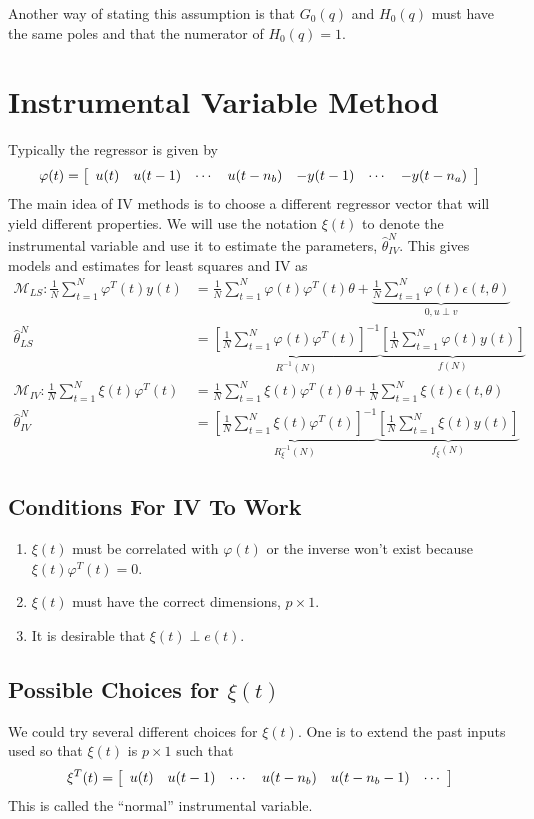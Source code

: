 \documentclass[lecture,12pt,]{pcms-l}
\theoremstyle{example}
\newcommand{\vp}{\varphi}
\newcommand{\fN}{\frac{1}{N}}
\newcommand{\sumt}{\sum_{t=1}^N}
\newcommand{\thn}{\hat{\theta}_{LS}^N}
\newcommand{\thiv}{\hat{\theta}_{IV}^N}
\begin{document}
Another way of stating this assumption is that $G_0(q)$ and $H_0(q)$ must have the same poles and that the numerator of $H_0(q)=1$.

\section{Instrumental Variable Method}
Typically the regressor is given by
$$\vp(t) = \left[\begin{array}{c c c c c c c} u(t) & u(t-1) & \cdots & u(t-n_b) & -y(t-1) & \cdots & -y(t-n_a) \end{array}\right]$$
The main idea of IV methods is to choose a different regressor vector that will yield different properties. We will use the notation $\xi(t)$ to denote the instrumental variable and use it to estimate the parameters, $\thiv$. This gives models and estimates for least squares and IV as
\begin{align*}
\mathcal{M}_{LS}: \fN\sumt\vp^T(t)y(t) &= \fN\sumt\vp(t)\vp^T(t)\theta + \underbrace{\fN\sumt\vp(t)\epsilon(t,\theta)}_{0,u\perp v} \\
\thn &= \underbrace{\left[\fN\sumt\vp(t)\vp^T(t)\right]^{-1}}_{R^{-1}(N)} \underbrace{\left[\fN\sumt\vp(t)y(t)\right]}_{f(N)} \\
\mathcal{M}_{IV}: \fN\sumt\xi(t)\vp^T(t) &= \fN\sumt\xi(t)\vp^T(t)\theta + \fN\sumt\xi(t)\epsilon(t,\theta) \\
\thiv &= \underbrace{\left[\fN\sumt\xi(t)\vp^T(t)\right]^{-1}}_{R_\xi^{-1}(N)} \underbrace{\left[\fN\sumt\xi(t)y(t)\right]}_{f_\xi(N)}
\end{align*}

\subsection{Conditions For IV To Work}
\begin{enumerate}
\item $\xi(t)$ must be correlated with $\vp(t)$ or the inverse won't exist because $\xi(t)\vp^T(t) = 0$.
\item $\xi(t)$ must have the correct dimensions, $p\times 1$.
\item It is desirable that $\xi(t)\perp e(t)$.
\end{enumerate}

\subsection{Possible Choices for $\xi(t)$}
We could try several different choices for $\xi(t)$. One is to extend the past inputs used so that $\xi(t)$ is $p\times 1$ such that
$$\xi^T(t) = \left[\begin{array}{c c c c c c} u(t) & u(t-1) & \cdots & u(t-n_b) & u(t-n_b-1) & \cdots \end{array}\right]$$
This is called the ``normal'' instrumental variable.
\end{document}
